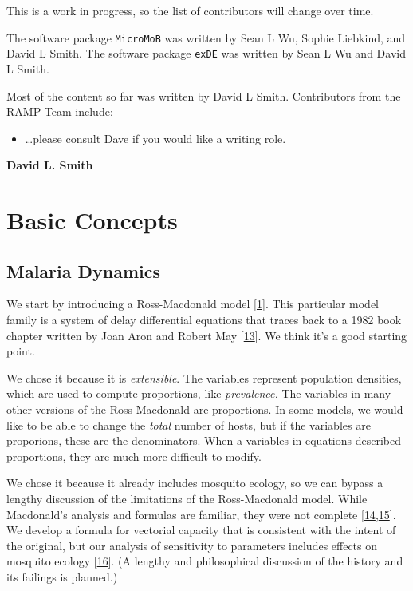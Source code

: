 \documentclass[
]{book}
\providecommand{\tightlist}{%
  \setlength{\itemsep}{0pt}\setlength{\parskip}{0pt}}
\begin{document}
This is a work in progress, so the list of contributors will change over time.

The software package \texttt{MicroMoB} was written by Sean L Wu, Sophie Liebkind, and David L Smith. The software package \texttt{exDE} was written by Sean L Wu and David L Smith.

Most of the content so far was written by David L Smith. Contributors from the RAMP Team include:

\begin{itemize}
\tightlist
\item
  \ldots please consult Dave if you would like a writing role.
\end{itemize}

\textbf{David L. Smith}

\hypertarget{part-basic-concepts}{%
\part{Basic Concepts}\label{part-basic-concepts}}

\hypertarget{malaria-dynamics}{%
\chapter{Malaria Dynamics}\label{malaria-dynamics}}

We start by introducing a Ross-Macdonald model {[}\protect\hyperlink{ref-SmithDL2012_RossMacdonald}{1}{]}. This particular model family is a system of delay differential equations that traces back to a 1982 book chapter written by Joan Aron and Robert May {[}\protect\hyperlink{ref-AronJL1982PopulationDynamics}{13}{]}. We think it's a good starting point.

We chose it because it is \emph{extensible}. The variables represent population densities, which are used to compute proportions, like \emph{prevalence.} The variables in many other versions of the Ross-Macdonald are proportions. In some models, we would like to be able to change the \emph{total} number of hosts, but if the variables are proporions, these are the denominators. When a variables in equations described proportions, they are much more difficult to modify.

We chose it because it already includes mosquito ecology, so we can bypass a lengthy discussion of the limitations of the Ross-Macdonald model. While Macdonald's analysis and formulas are familiar, they were not complete {[}\protect\hyperlink{ref-SmithDL2004_Statics}{14},\protect\hyperlink{ref-SmithDL2021_NewTestOldMosquitoes}{15}{]}. We develop a formula for vectorial capacity that is consistent with the intent of the original, but our analysis of sensitivity to parameters includes effects on mosquito ecology {[}\protect\hyperlink{ref-BradyOJ2015AdultVector}{16}{]}. (A lengthy and philosophical discussion of the history and its failings is planned.)
\end{document}
